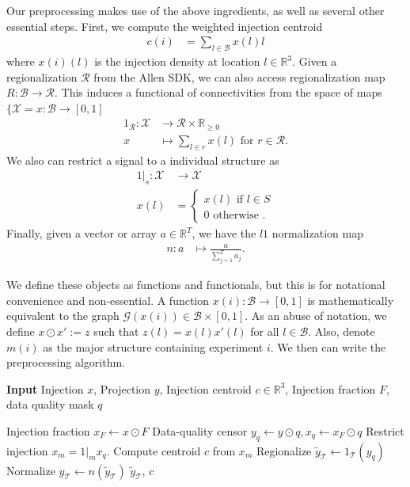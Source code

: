 Our preprocessing makes use of the above ingredients, as well as several other essential steps.
First, we compute the weighted injection centroid
\begin{eqnarray*}
c(i) &= \sum_{l \in \mathcal B} x(l) l
\end{eqnarray*}
where $x(i)(l)$ is the injection density at location $l \in \mathbb R^3$.
Given a regionalization $\mathcal R$ from the Allen SDK, we can also access regionalization map $R: \mathcal B  \to \mathcal R $.
This induces a functional of connectivities from the space of maps $\{\mathcal X = x: \mathcal B \to [0,1]$
\begin{eqnarray*}
1_{\mathcal R}: \mathcal X &\to \mathcal R \times \mathbb R_{\geq 0} \\
x &\mapsto \sum_{l \in r}  x(l)  \text{ for } r \in \mathcal R.
\end{eqnarray*}
We also can restrict a signal to a individual structure as
\begin{eqnarray*}
1 |_s :  \mathcal X &\to  \mathcal X \\
 x(l) &= \begin{cases} 
 x(l) \text{ if } l \in S \\
 0 \text{ otherwise }.
 \end{cases}
\end{eqnarray*}
Finally, given a vector or array $a \in \mathbb R^T$, we have the $l1$ normalization map
\begin{eqnarray*}
n: a &\mapsto \frac{a}{\sum_{j = 1}^T a_j}.
\end{eqnarray*}

We define these objects as functions and functionals, but this is for notational convenience and non-essential.
A function $x(i):\mathcal B \to [0,1]$ is mathematically equivalent to the graph $\mathcal G(x(i)) \in \mathcal B \times [0,1]$.
As an abuse of notation, we define $x \odot x' := z$ such that $z(l) = x(l) x'(l)$ for all $l \in \mathcal B$.
Also, denote $m(i)$ as the major structure containing experiment $i$.
We then can write the preprocessing algorithm.

\begin{algorithm}[H]
\caption{{\bf Input} Injection $x$, Projection $y$, Injection centroid $c \in \mathbb R^3$, Injection fraction $F$, data quality mask $q$}
\label{alg:preprocess}
\begin{algorithmic}
\State Injection fraction $x_F \gets x\odot F$
\State Data-quality censor $y_q \gets  y \odot q , x_q \gets x_F \odot q$
\State Restrict injection $x_m = 1 |_{m} x_q $.
\State Compute centroid $c$ from $x_m $
\State Regionalize $\tilde y_{\mathcal T}  \gets 1_{\mathcal T}(  y_q)$
\State Normalize $ y_{\mathcal T}  \gets n(\tilde y_{\mathcal T}  )$
 $\tilde y_{\mathcal T} $, $c$ 
\end{algorithmic}
\end{algorithm}

